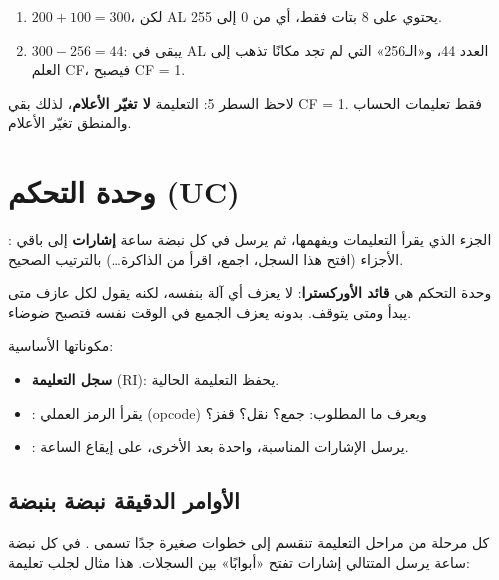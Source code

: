 \begin{khatwa}
    \begin{enumerate}
        \item $200 + 100 = 300$، لكن \textenglish{AL} يحتوي على 8 بتات فقط، أي من 0 إلى 255.
        \item $300 - 256 = 44$: يبقى في \textenglish{AL} العدد 44، و«الـ256» التي لم تجد مكانًا تذهب إلى
              العلم \textenglish{CF}، فيصبح \textenglish{CF = 1}.
    \end{enumerate}
\end{khatwa}

\begin{intabih}
    لاحظ السطر 5: التعليمة  \textbf{لا تغيّر الأعلام}، لذلك بقي \textenglish{CF = 1}. فقط
    تعليمات الحساب والمنطق تغيّر الأعلام.
\end{intabih}

\section{وحدة التحكم \textenglish{(UC)}}

\begin{tarif}
    : الجزء الذي يقرأ التعليمات
    ويفهمها، ثم يرسل في كل نبضة ساعة \textbf{إشارات} إلى باقي الأجزاء (افتح هذا السجل، اجمع،
    اقرأ من الذاكرة\dots) بالترتيب الصحيح.
\end{tarif}

\begin{tashbih}
    وحدة التحكم هي \textbf{قائد الأوركسترا}: لا يعزف أي آلة بنفسه، لكنه يقول لكل عازف متى يبدأ ومتى
    يتوقف. بدونه يعزف الجميع في الوقت نفسه فتصبح ضوضاء.
\end{tashbih}

مكوناتها الأساسية:
\begin{itemize}
    \item \textbf{سجل التعليمة} \textenglish{(RI)}: يحفظ التعليمة الحالية.
    \item {}: يقرأ الرمز العملي \textenglish{(opcode)} ويعرف
          ما المطلوب: جمع؟ نقل؟ قفز؟
    \item {}: يرسل الإشارات المناسبة، واحدة بعد الأخرى،
          على إيقاع الساعة.
\end{itemize}

\subsection{الأوامر الدقيقة نبضة بنبضة}
كل مرحلة من مراحل التعليمة تنقسم إلى خطوات صغيرة جدًا تسمى .
في كل نبضة ساعة يرسل المتتالي إشارات تفتح «أبوابًا» بين السجلات. هذا مثال لجلب تعليمة:

